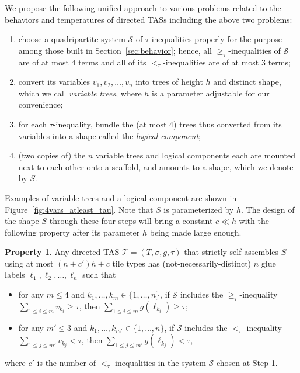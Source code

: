 \documentclass{article}
\theoremstyle{remark}
\theoremstyle{definition}
\newtheorem{property}{Property}
\newcommand{\tas}{\ensuremath{\mathcal{T}}}
\begin{document}
We propose the following unified approach to various problems related to the behaviors and temperatures of directed TASs including the above two problems: 
\begin{enumerate}[Step 1.]
\item	choose a quadripartite system $\mathcal{S}$ of $\tau$-inequalities properly for the purpose among those built in Section~\ref{sec:behavior}; hence, all $\ge_\tau$-inequalities of $\mathcal{S}$ are of at most 4 terms and all of its $<_\tau$-inequalities are of at most 3 terms; 
\item	convert its variables $v_1, v_2, \ldots, v_n$ into trees of height $h$ and distinct shape, which we call {\it variable trees}, where $h$ is a parameter adjustable for our convenience;
\item	for each $\tau$-inequality, bundle the (at most 4) trees thus converted from its variables into a shape called the {\it logical component}; 
\item	(two copies of) the $n$ variable trees and logical components each are mounted next to each other onto a scaffold, and amounts to a shape, which we denote by $S$. 
\end{enumerate}
Examples of variable trees and a logical component are shown in Figure~\ref{fig:4vars_atleast_tau}. 
Note that $S$ is parameterized by $h$. 
The design of the shape $S$ through these four steps will bring a constant $c \ll h$ with the following property after its parameter $h$ being made large enough. 

\begin{property}\label{property:TAS_as_inequality_system_solver}
Any directed TAS $\tas = (T, \sigma, g, \tau)$ that strictly self-assembles $S$ using at most $(n + c')h + c$ tile types has (not-necessarily-distinct) $n$ glue labels $\ell_1, \ell_2, \ldots, \ell_n$ such that 
\begin{itemize}
\item	for any $m \le 4$ and $k_1, \ldots, k_m \in \{1, \ldots, n\}$, if $\mathcal{S}$ includes the $\ge_\tau$-inequality $\sum_{1 \le i \le m} v_{k_i} \ge \tau$, then $\sum_{1 \le i \le m} g(\ell_{k_i}) \ge \tau$; 
\item	for any $m' \le 3$ and $k_1, \ldots, k_{m'} \in \{1, \ldots, n\}$, if $\mathcal{S}$ includes the $<_\tau$-inequality $\sum_{1 \le j \le m'} v_{k_j} < \tau$, then $\sum_{1 \le j \le m'} g(\ell_{k_j}) < \tau$, 
\end{itemize}
where $c'$ is the number of $<_\tau$-inequalities in the system $\mathcal{S}$ chosen at Step 1. 
\end{property}
\end{document}
